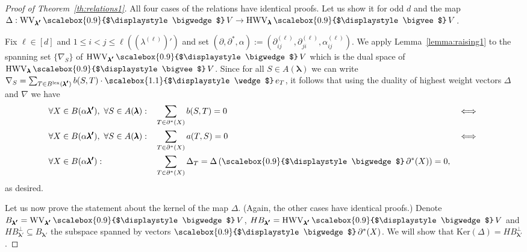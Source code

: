 \documentclass[12pt, reqno]{amsart}
\theoremstyle{definition}
\let\oldbigwedge\bigwedge
\let\oldbigvee\bigvee
\let\oldwedge\wedge
\renewcommand{\bigwedge}{
  \mathop{
    \vcenter{
      \hbox{\scalebox{0.9}{$\displaystyle\oldbigwedge$}}
    }
  }
}
\renewcommand{\bigvee}{
  \mathop{
    \vcenter{
      \hbox{\scalebox{0.9}{$\displaystyle\oldbigvee$}}
    }
  }
}
\renewcommand{\wedge}{
  \mathop{
    \vcenter{
      \hbox{\scalebox{1.1}{$\displaystyle\oldwedge$}}
    }
  }
}
\begin{document}
\vspace{1em}

\begin{proof}[Proof of Theorem~\ref{th:relations1}]
    All four cases of the relations have identical proofs. Let us show it for odd $d$ and the map $\Delta: \mathrm{WV}_{\pmb{\lambda'}} \bigwedge V \to \mathrm{HWV}_{\pmb{\lambda}} \bigvee V$. %

    Fix $\ell \in [d]$ and $1 \le i < j \le \ell((\lambda^{(\ell)})')$ and set $(\partial, \partial^*, \alpha):=(\partial^{(\ell)}_{ij}, \partial^{(\ell)}_{ji}, \alpha^{(\ell)}_{ij})$.
    We apply Lemma~\ref{lemma:raising1} to the spanning set $\{\nabla_S\}$ of 
    $\mathrm{HWV}_{\pmb{\lambda'}} \bigwedge V$ %
    which is the dual space of $\mathrm{HWV}_{\pmb{\lambda}} \bigvee V$. %
    Since for all $S \in A(\pmb{\lambda})$ we can write $\nabla_S = \sum_{T \in B^{\mathrm{lex}}(\pmb{\lambda'})} b(S,T) \cdot \wedge e_T$, it follows that using the duality of highest weight vectors $\Delta$ and $\nabla$ we have 
    \begin{align*}
        \forall X &\in B(\alpha \pmb{\lambda'}),\ \forall S \in A(\pmb{\lambda}): &  &\sum_{T \in \partial^*(X)} b(S,T) = 0 &\iff\\
        \forall X &\in B(\alpha \pmb{\lambda'}),\ \forall S \in A(\pmb{\lambda}): & &\sum_{T \in \partial^*(X)} a(T,S) = 0 &\iff\\
        \forall X &\in B(\alpha \pmb{\lambda'}): & &\sum_{T \in \partial^*(X)} \Delta_{T} = \Delta\left(\bigwedge{\partial^*(X)}\right) = 0,
    \end{align*}
    as desired.

    Let us now prove the statement about the kernel of the map $\Delta$. (Again, the other cases have identical proofs.) 
    Denote $B_{\pmb{\lambda'}} = \mathrm{WV}_{\pmb{\lambda'}} \bigwedge V$, $HB_{\pmb{\lambda'}} = \mathrm{HWV}_{\pmb{\lambda'}} \bigwedge V$
    and $HB^{\perp}_{\pmb{\lambda'}} \subseteq B_{\pmb{\lambda'}}$ the subspace spanned by vectors $\bigwedge {\partial^*(X)}$. We will show that $\mathrm{Ker}(\Delta) = HB^{\perp}_{\pmb{\lambda'}}$.
    

\end{proof}
\end{document}
